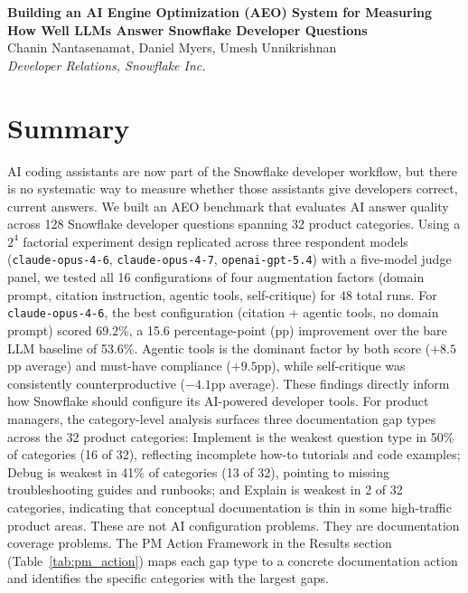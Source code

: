 \documentclass[10pt,letterpaper]{article}
\begin{document}

\vspace*{0.35in}

\begin{flushleft}
{\Large
\textbf{Building an AI Engine Optimization (AEO) System for Measuring How Well LLMs Answer Snowflake Developer Questions}
}
\newline
\\
Chanin Nantasenamat,
Daniel Myers,
Umesh Unnikrishnan
\\
\bigskip
\textit{Developer Relations, Snowflake Inc.}
\\
\bigskip
\end{flushleft}

\section*{Summary}

AI coding assistants are now part of the Snowflake developer workflow, but there is no systematic way to measure whether those assistants give developers correct, current answers. We built an AEO benchmark that evaluates AI answer quality across 128 Snowflake developer questions spanning 32 product categories. Using a $2^4$ factorial experiment design replicated across three respondent models (\texttt{claude-opus-4-6}, \texttt{claude-opus-4-7}, \texttt{openai-gpt-5.4}) with a five-model judge panel, we tested all 16 configurations of four augmentation factors (domain prompt, citation instruction, agentic tools, self-critique) for 48 total runs. For \texttt{claude-opus-4-6}, the best configuration (citation + agentic tools, no domain prompt) scored 69.2\%, a 15.6 percentage-point (pp) improvement over the bare LLM baseline of 53.6\%. Agentic tools is the dominant factor by both score ($+8.5$pp average) and must-have compliance ($+9.5$pp), while self-critique was consistently counterproductive ($-4.1$pp average). These findings directly inform how Snowflake should configure its AI-powered developer tools. For product managers, the category-level analysis surfaces three documentation gap types across the 32 product categories: Implement is the weakest question type in 50\% of categories (16 of 32), reflecting incomplete how-to tutorials and code examples; Debug is weakest in 41\% of categories (13 of 32), pointing to missing troubleshooting guides and runbooks; and Explain is weakest in 2 of 32 categories, indicating that conceptual documentation is thin in some high-traffic product areas. These are not AI configuration problems. They are documentation coverage problems. The PM Action Framework in the Results section (Table~\ref{tab:pm_action}) maps each gap type to a concrete documentation action and identifies the specific categories with the largest gaps.
\end{document}
